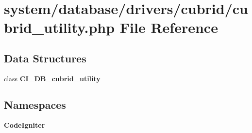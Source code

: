 \section{system/database/drivers/cubrid/cubrid\-\_\-utility.php File Reference}
\label{cubrid__utility_8php}
\subsection*{Data Structures}
\begin{DoxyCompactItemize}
\item 
class {\bf C\-I\-\_\-\-D\-B\-\_\-cubrid\-\_\-utility}
\end{DoxyCompactItemize}
\subsection*{Namespaces}
\begin{DoxyCompactItemize}
\item 
{\bf Code\-Igniter}
\end{DoxyCompactItemize}
